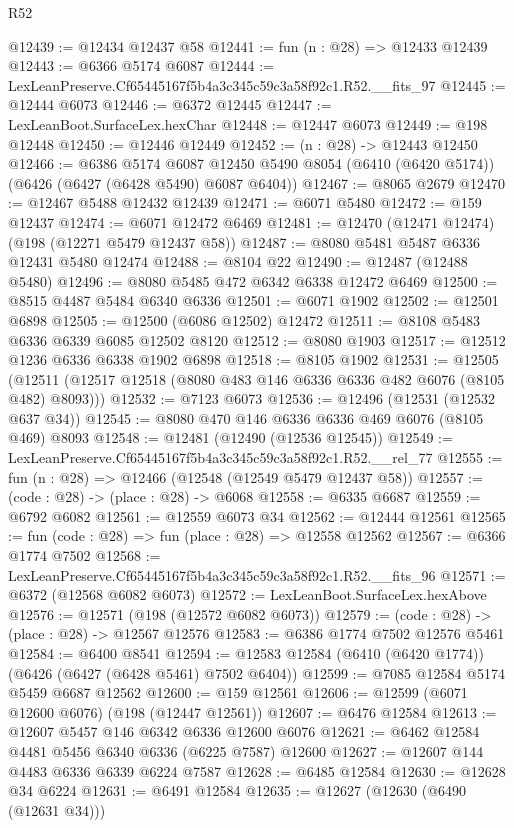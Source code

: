 \begin{lexlean}{R52}
\begin{coremodule}
@12439 := @12434 @12437 @58
@12441 := fun (n : @28) => @12433 @12439
@12443 := @6366 @5174 @6087
@12444 := LexLeanPreserve.Cf65445167f5b4a3c345c59c3a58f92c1.R52.__fits_97
@12445 := @12444 @6073
@12446 := @6372 @12445
@12447 := LexLeanBoot.SurfaceLex.hexChar
@12448 := @12447 @6073
@12449 := @198 @12448
@12450 := @12446 @12449
@12452 := (n : @28) -> @12443 @12450
@12466 := @6386
    @5174
    @6087
    @12450
    @5490
    @8054
    (@6410 (@6420 @5174))
    (@6426 (@6427 (@6428 @5490) @6087 @6404))
@12467 := @8065 @2679
@12470 := @12467 @5488 @12432 @12439
@12471 := @6071 @5480
@12472 := @159 @12437
@12474 := @6071 @12472 @6469
@12481 := @12470 (@12471 @12474) (@198 (@12271 @5479 @12437 @58))
@12487 := @8080 @5481 @5487 @6336 @12431 @5480 @12474
@12488 := @8104 @22
@12490 := @12487 (@12488 @5480)
@12496 := @8080 @5485 @472 @6342 @6338 @12472 @6469
@12500 := @8515 @4487 @5484 @6340 @6336
@12501 := @6071 @1902
@12502 := @12501 @6898
@12505 := @12500 (@6086 @12502) @12472
@12511 := @8108 @5483 @6336 @6339 @6085 @12502 @8120
@12512 := @8080 @1903
@12517 := @12512 @1236 @6336 @6338 @1902 @6898
@12518 := @8105 @1902
@12531 := @12505
    (@12511 (@12517 @12518 (@8080 @483 @146 @6336 @6336 @482 @6076 (@8105 @482) @8093)))
@12532 := @7123 @6073
@12536 := @12496 (@12531 (@12532 @637 @34))
@12545 := @8080 @470 @146 @6336 @6336 @469 @6076 (@8105 @469) @8093
@12548 := @12481 (@12490 (@12536 @12545))
@12549 := LexLeanPreserve.Cf65445167f5b4a3c345c59c3a58f92c1.R52.__rel_77
@12555 := fun (n : @28) => @12466 (@12548 (@12549 @5479 @12437 @58))
@12557 := (code : @28) -> (place : @28) -> @6068
@12558 := @6335 @6687
@12559 := @6792 @6082
@12561 := @12559 @6073 @34
@12562 := @12444 @12561
@12565 := fun (code : @28) => fun (place : @28) => @12558 @12562
@12567 := @6366 @1774 @7502
@12568 := LexLeanPreserve.Cf65445167f5b4a3c345c59c3a58f92c1.R52.__fits_96
@12571 := @6372 (@12568 @6082 @6073)
@12572 := LexLeanBoot.SurfaceLex.hexAbove
@12576 := @12571 (@198 (@12572 @6082 @6073))
@12579 := (code : @28) -> (place : @28) -> @12567 @12576
@12583 := @6386 @1774 @7502 @12576 @5461
@12584 := @6400 @8541
@12594 := @12583 @12584 (@6410 (@6420 @1774)) (@6426 (@6427 (@6428 @5461) @7502 @6404))
@12599 := @7085 @12584 @5174 @5459 @6687 @12562
@12600 := @159 @12561
@12606 := @12599 (@6071 @12600 @6076) (@198 (@12447 @12561))
@12607 := @6476 @12584
@12613 := @12607 @5457 @146 @6342 @6336 @12600 @6076
@12621 := @6462 @12584 @4481 @5456 @6340 @6336 (@6225 @7587) @12600
@12627 := @12607 @144 @4483 @6336 @6339 @6224 @7587
@12628 := @6485 @12584
@12630 := @12628 @34 @6224
@12631 := @6491 @12584
@12635 := @12627 (@12630 (@6490 (@12631 @34)))

\end{coremodule}
\end{lexlean}
